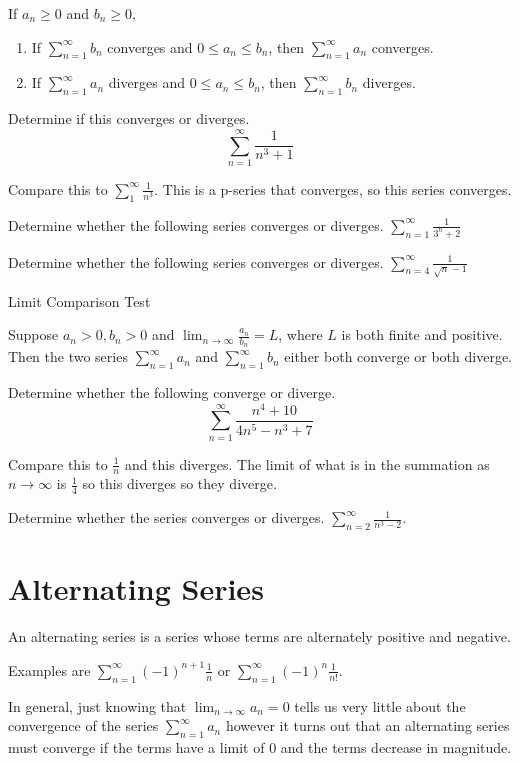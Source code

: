 \documentclass[../bccalc.tex]{subfiles}
\begin{document}
If $a_n\geq 0$ and $b_n\geq 0$,
\begin{enumerate}
    \item If $\sum_{n=1}^{\infty}b_n$ converges and $0\leq a_n\leq b_n$, then $\sum_{n=1}^{\infty}a_n$ converges.
    \item If $\sum_{n=1}^{\infty}a_n$ diverges and $0\leq a_n\leq b_n$, then $\sum_{n=1}^{\infty}b_n$ diverges.
\end{enumerate}

\begin{example}
    Determine if this converges or diverges.
    \[ \sum_{n=1}^{\infty}\frac{1}{n^3+1} \]

    Compare this to $\sum_{1}^{\infty}\frac{1}{n^3}$. This is a p-series that converges, so this series converges.
\end{example}

\ex Determine whether the following series converges or diverges. $\sum_{n=1}^{\infty}\frac{1}{3^n+2}$

\ex Determine whether the following series converges or diverges. $\sum_{n=4}^{\infty}\frac{1}{\sqrt{n}-1}$

Limit Comparison Test 

Suppose $a_n>0, b_n>0$ and $\lim_{n\to\infty}\frac{a_n}{b_n}=L$, where $L$ is both finite and positive. Then the two series $\sum_{n=1}^{\infty}a_n$ and $\sum_{n=1}^{\infty}b_n$ either both converge or both diverge.

\begin{example}
    Determine whether the following converge or diverge.
    \[ \sum_{n=1}^{\infty}\frac{n^4+10}{4n^5-n^3+7} \]

    Compare this to $\frac{1}{n}$ and this diverges. The limit of what is in the summation as $n\rightarrow \infty$ is $\frac{1}{4}$ so this diverges so they diverge.
\end{example}

\ex Determine whether the series converges or diverges. $\sum_{n=2}^{\infty}\frac{1}{n^3-2}$.

\section{Alternating Series}
An alternating series is a series whose terms are alternately positive and negative.

Examples are $\sum_{n=1}^{\infty}(-1)^{n+1}\frac{1}{n}$ or $\sum_{n=1}^{\infty}(-1)^n \frac{1}{n!}$.

In general, just knowing that $\lim_{n\to\infty}a_n=0$ tells us very little about the convergence of the series $\sum_{n=1}^{\infty}a_n$ however it turns out that an alternating series must converge if the terms have a limit of 0 and the terms decrease in magnitude.
\end{document}

